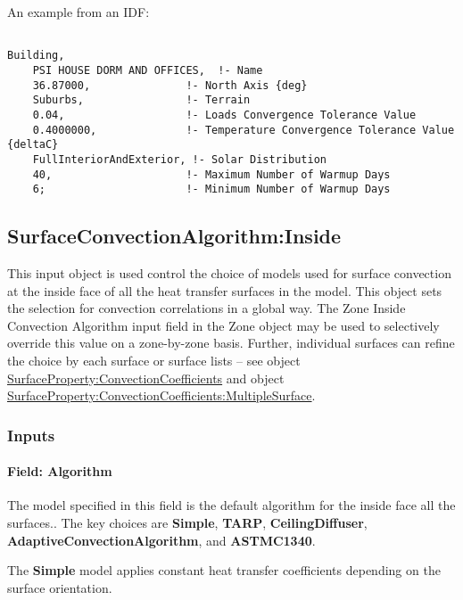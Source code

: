 An example from an IDF:

\begin{lstlisting}

Building,
    PSI HOUSE DORM AND OFFICES,  !- Name
    36.87000,               !- North Axis {deg}
    Suburbs,                !- Terrain
    0.04,                   !- Loads Convergence Tolerance Value
    0.4000000,              !- Temperature Convergence Tolerance Value {deltaC}
    FullInteriorAndExterior, !- Solar Distribution
    40,                     !- Maximum Number of Warmup Days
    6;                      !- Minimum Number of Warmup Days
\end{lstlisting}

\subsection{SurfaceConvectionAlgorithm:Inside}\label{surfaceconvectionalgorithminside}

This input object is used control the choice of models used for surface convection at the inside face of all the heat transfer surfaces in the model. This object sets the selection for convection correlations in a global way. The Zone Inside Convection Algorithm input field in the Zone object may be used to selectively override this value on a zone-by-zone basis. Further, individual surfaces can refine the choice by each surface or surface lists -- see object \hyperref[surfacepropertyconvectioncoefficients]{SurfaceProperty:ConvectionCoefficients} and object \hyperref[surfacepropertyconvectioncoefficientsmultiplesurface]{SurfaceProperty:ConvectionCoefficients:MultipleSurface}.

\subsubsection{Inputs}\label{inputs-4-031}

\paragraph{Field: Algorithm}\label{field-algorithm-000}

The model specified in this field is the default algorithm for the inside face all the surfaces.. The key choices are \textbf{Simple}, \textbf{TARP}, \textbf{CeilingDiffuser}, \textbf{AdaptiveConvectionAlgorithm}, and \textbf{ASTMC1340}.

The \textbf{Simple} model applies constant heat transfer coefficients depending on the surface orientation.

